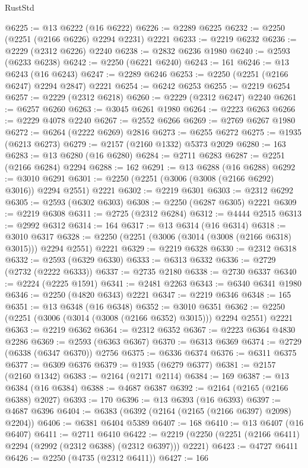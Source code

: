 \begin{lexlean}{RustStd}
\begin{coremodule}
{\begin{coremodule}
{{{{{{{{{{{{{{{{{{{{{{{{{{{{{{{{{{{{{{{{{{{{{{{{{{{{{@6225 := @13 @6222 (@16 @6222)
@6226 := @2289 @6225
@6232 := @2250 (@2251 (@2166 @6226) @2294 @2231) @2221
@6233 := @2219 @6232
@6236 := @2229 (@2312 @6226) @2240
@6238 := @2832 @6236 @1980
@6240 := @2593 (@6233 @6238)
@6242 := @2250 (@6221 @6240)
@6243 := 161
@6246 := @13 @6243 (@16 @6243)
@6247 := @2289 @6246
@6253 := @2250 (@2251 (@2166 @6247) @2294 @2847) @2221
@6254 := @6242 @6253
@6255 := @2219 @6254
@6257 := @2229 (@2312 @6218)
@6260 := @2229 (@2312 @6247) @2240
@6261 := @6257 @6260
@6263 := @3045 @6261 @1980
@6264 := @2223 @6263
@6266 := @2229 @4078 @2240
@6267 := @2552 @6266
@6269 := @2769 @6267 @1980
@6272 := @6264 (@2222 @6269) @2816
@6273 := @6255 @6272
@6275 := @1935 (@6213 @6273)
@6279 := @2157 (@2160 @1332) @5373 @2029
@6280 := 163
@6283 := @13 @6280 (@16 @6280)
@6284 := @2711 @6283
@6287 := @2251 (@2166 @6284) @2294
@6288 := 162
@6291 := @13 @6288 (@16 @6288)
@6292 := @3010 @6291
@6301 := @2250 (@2251 (@3006 (@3008 (@2166 @6292) @3016)) @2294 @2551) @2221
@6302 := @2219 @6301
@6303 := @2312 @6292
@6305 := @2593 (@6302 @6303)
@6308 := @2250 (@6287 @6305) @2221
@6309 := @2219 @6308
@6311 := @2725 (@2312 @6284)
@6312 := @4444 @2515
@6313 := @2992 @6312
@6314 := 164
@6317 := @13 @6314 (@16 @6314)
@6318 := @3010 @6317
@6328 := @2250 (@2251 (@3006 (@3014 (@3008 (@2166 @6318) @3015))) @2294 @2551) @2221
@6329 := @2219 @6328
@6330 := @2312 @6318
@6332 := @2593 (@6329 @6330)
@6333 := @6313 @6332
@6336 := @2729 (@2732 (@2222 @6333))
@6337 := @2735 @2180
@6338 := @2730 @6337
@6340 := @2224 (@2225 @1591)
@6341 := @2481 @2263
@6343 := @6340 @6341 @1980
@6346 := @2250 (@4820 @6343) @2221
@6347 := @2219 @6346
@6348 := 165
@6351 := @13 @6348 (@16 @6348)
@6352 := @3010 @6351
@6362 := @2250 (@2251 (@3006 (@3014 (@3008 (@2166 @6352) @3015))) @2294 @2551) @2221
@6363 := @2219 @6362
@6364 := @2312 @6352
@6367 := @2223 @6364 @4830 @2286
@6369 := @2593 (@6363 @6367)
@6370 := @6313 @6369
@6374 := @2729 (@6338 (@6347 @6370)) @2756
@6375 := @6336 @6374
@6376 := @6311 @6375
@6377 := @6309 @6376
@6379 := @1935 (@6279 @6377)
@6381 := @2157 (@2160 @1342)
@6383 := @2164 (@2171 @2114)
@6384 := 169
@6387 := @13 @6384 (@16 @6384)
@6388 := @4687 @6387
@6392 := @2164 (@2165 (@2166 @6388) @2027)
@6393 := 170
@6396 := @13 @6393 (@16 @6393)
@6397 := @4687 @6396
@6404 := @6383 (@6392 (@2164 (@2165 (@2166 @6397) @2098) @2204))
@6406 := @6381 @6404 @5389
@6407 := 168
@6410 := @13 @6407 (@16 @6407)
@6411 := @2711 @6410
@6422 := @2219 (@2250 (@2251 (@2166 @6411) @2294 (@2992 (@2312 @6388) (@2312 @6397))) @2221)
@6423 := @4727 @6411
@6426 := @2250 (@4735 (@2312 @6411))
@6427 := 166
}}}}}}}}}}}}}}}}}}}}}}}}}}}}}}}}}}}}}}}}}}}}}}}}}}}}}
\end{coremodule}}
\end{coremodule}
\end{lexlean}
